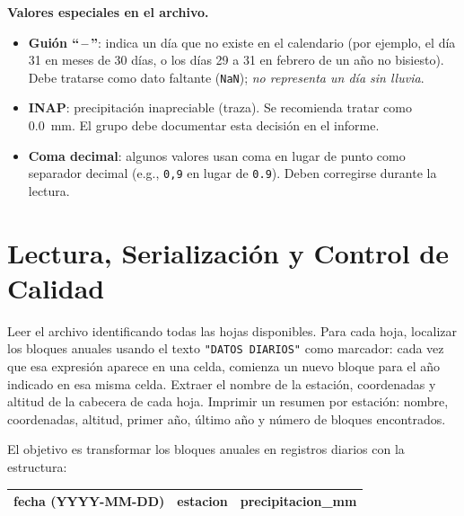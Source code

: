 \documentclass[11pt]{article}
\begin{document}
\begin{infobox}
\textbf{Valores especiales en el archivo.}
\begin{itemize}
  \item \textbf{Guión ``\,--\,''}: indica un día que no existe en el calendario
    (por ejemplo, el día 31 en meses de 30 días, o los días 29 a 31 en febrero
    de un año no bisiesto).  Debe tratarse como dato faltante
    (\texttt{NaN}); \emph{no representa un día sin lluvia}.

  \item \textbf{INAP}: precipitación inapreciable (traza).
    Se recomienda tratar como 0.0~mm.  El grupo debe documentar esta
    decisión en el informe.

  \item \textbf{Coma decimal}: algunos valores usan coma en lugar de punto como
    separador decimal (e.g., \texttt{0,9} en lugar de \texttt{0.9}).
    Deben corregirse durante la lectura.
\end{itemize}
\end{infobox}

\section{Lectura, Serialización y Control de Calidad}


Leer el archivo identificando todas las hojas disponibles.
Para cada hoja, localizar los bloques anuales usando el texto
\texttt{"DATOS DIARIOS"} como marcador: cada vez que esa expresión
aparece en una celda, comienza un nuevo bloque para el año indicado
en esa misma celda.
Extraer el nombre de la estación, coordenadas y altitud de la
cabecera de cada hoja.
Imprimir un resumen por estación: nombre, coordenadas, altitud,
primer año, último año y número de bloques encontrados.


El objetivo es transformar los bloques anuales en registros diarios con la estructura:

\begin{center}
\ttfamily
\begin{tabular}{lll}
\toprule
fecha (YYYY-MM-DD) & estacion & precipitacion\_mm \\
\bottomrule
\end{tabular}
\end{center}
\end{document}
